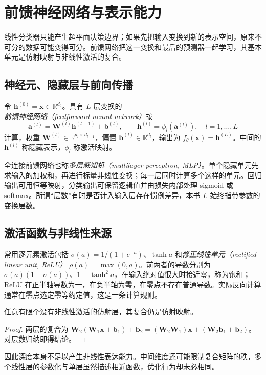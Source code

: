 \setcounter{chapter}{4} %
\chapter{前馈神经网络与表示能力}
\label{chap:dl-mlp}
线性分类器只能产生超平面决策边界；如果先把输入变换到新的表示空间，原来不可分的数据可能变得可分。前馈网络把这一变换和最后的预测器一起学习，其基本单元是仿射映射与非线性激活的复合。

\section{神经元、隐藏层与前向传播}
\begin{definition}[前馈网络]
令 $\mathbf h^{(0)}=\mathbf x\in\mathbb R^{d_0}$。具有 $L$ 层变换的\emph{前馈神经网络（feedforward neural network）}按
\begin{equation}
\mathbf a^{(l)}=\mathbf W^{(l)}\mathbf h^{(l-1)}+\mathbf b^{(l)},\qquad
\mathbf h^{(l)}=\phi_l(\mathbf a^{(l)}),\quad l=1,\ldots,L
\label{eq:dl-forward-layer}
\end{equation}
计算，权重 $\mathbf W^{(l)}\in\mathbb R^{d_l\times d_{l-1}}$，偏置 $\mathbf b^{(l)}\in\mathbb R^{d_l}$，输出为 $f_\theta(\mathbf x)=\mathbf h^{(L)}$。中间的 $\mathbf h^{(l)}$ 称隐藏表示，$\phi_l$ 称激活映射。
\end{definition}
全连接前馈网络也称\emph{多层感知机（multilayer perceptron, MLP）}。单个隐藏单元先求输入的加权和，再进行标量非线性变换；每一层同时计算多个这样的单元。回归输出可用恒等映射，分类输出可保留逻辑值并由损失内部处理 sigmoid 或 softmax。所谓“层数”有时是否计入输入层存在惯例差异，本书 $L$ 始终指带参数的变换层数。

\section{激活函数与非线性来源}
常用逐元素激活包括 $\sigma(a)=1/(1+e^{-a})$、$\tanh a$ 和\emph{修正线性单元（rectified linear unit, ReLU）} $\rho(a)=\max(0,a)$。前两者的导数分别为 $\sigma(a)(1-\sigma(a))$、$1-\tanh^2a$，在输入绝对值很大时接近零，称为饱和；ReLU 在正半轴导数为一，在负半轴为零，在零点不存在普通导数。实际反向计算通常在零点选定零等约定值，这是一条计算规则。

\begin{proposition}[仿射层的合并]
任意有限个没有非线性激活的仿射层，其复合仍是仿射映射。
\end{proposition}
\begin{proof}
两层的复合为 $\mathbf W_2(\mathbf W_1\mathbf x+\mathbf b_1)+\mathbf b_2=(\mathbf W_2\mathbf W_1)\mathbf x+(\mathbf W_2\mathbf b_1+\mathbf b_2)$。对层数归纳即得结论。
\end{proof}
因此深度本身不足以产生非线性表达能力。中间维度还可能限制复合矩阵的秩，多个线性层的参数化与单层虽然描述相近函数，优化行为却未必相同。

